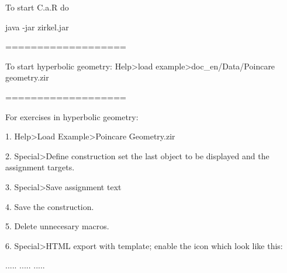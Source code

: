To start C.a.R do

java -jar zirkel.jar

===================

To start hyperbolic geometry:
Help>load example>doc_en/Data/Poincare geometry.zir

===================

For exercises in hyperbolic geometry:

1. Help>Load Example>Poincare Geometry.zir

2. Special>Define construction set the last object to be displayed and the assignment targets.

3. Special>Save assignment text

4. Save the construction.

5. Delete unnecesary macros.

6. Special>HTML export with template; enable the icon which look like this:

.....
.....
.....
